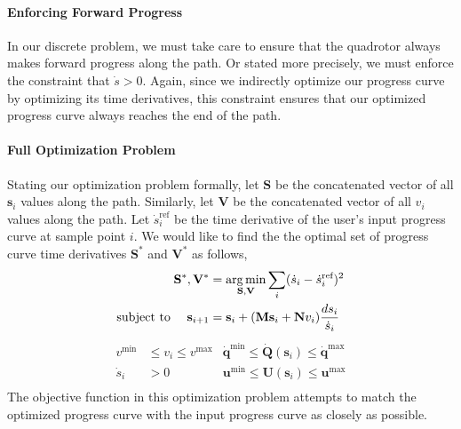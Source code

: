 \paragraph{Enforcing Forward Progress}
In our discrete problem, we must take care to ensure that the quadrotor always makes forward progress along the path.
Or stated more precisely, we must enforce the constraint that $\dot{s} > 0$.
Again, since we indirectly optimize our progress curve by optimizing its time derivatives, this constraint ensures that our optimized progress curve always reaches the end of the path.

\paragraph{Full Optimization Problem}

Stating our optimization problem formally, let $\mathbf{S}$ be the concatenated vector of all $\mathbf{s}_i$ values along the path.
Similarly, let $\mathbf{V}$ be the concatenated vector of all $v_i$ values along the path.
Let $\dot{s}_i^{\text{ref}}$ be the  time derivative of the user's input progress curve at sample point $i$.
We would like to find the the optimal set of progress curve time derivatives $\mathbf{S}^*$ and $\mathbf{V}^*$ as follows, 
%
\begin{equation*}
\begin{aligned}
\mathbf{S}^{*},\mathbf{V}^{*} & = \operatorname*{arg\,min}_{\mathbf{S},\mathbf{V}} \sum_{i} ( \dot{s}_i - \dot{s}_i^{\text{ref}} )^{2} \\
\text{subject to~~~~}
\mathbf{s}_{i+1}              & =    \mathbf{s}_{i} + (\mathbf{M}\mathbf{s}_{i} + \mathbf{N}v_{i}) \frac{ds_i}{\dot{s}_i} \\
\end{aligned}
\end{equation*}
%
\vspace{-5pt}
\begin{equation}
\begin{aligned}
v^{\text{min}}  & \leq v_i \leq v^{\text{max}} & \dot{\mathbf{q}}^{\text{min}}  \leq \dot{\mathbf{Q}}(\mathbf{s}_i) \leq \dot{\mathbf{q}}^{\text{max}} \\
\dot{s}_i       & > 0                          & \mathbf{u}^{\text{min}}          \leq \mathbf{U}(\mathbf{s}_i)       \leq \mathbf{u}^{\text{max}} \\
\end{aligned}
\label{eqn:s_star_v_star}
\end{equation}
%
The objective function in this optimization problem attempts to match the optimized progress curve with the input progress curve as closely as possible.
